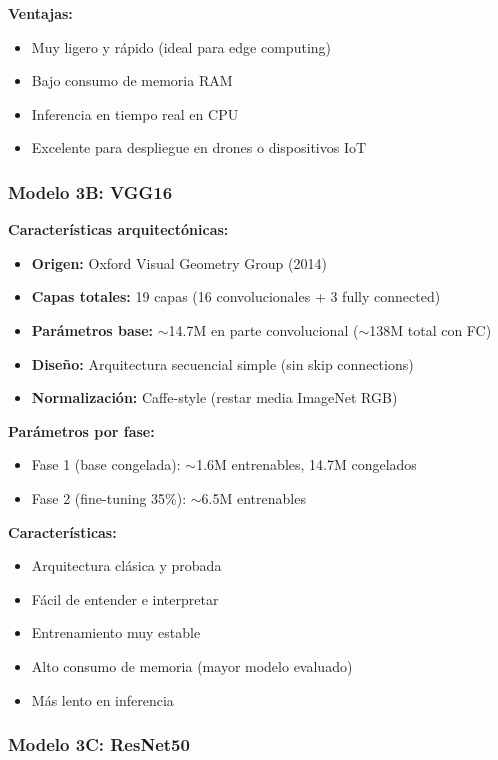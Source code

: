 \documentclass[11pt, a4paper]{article}
\begin{document}
\textbf{Ventajas:}
\begin{itemize}
    \item Muy ligero y rápido (ideal para edge computing)
    \item Bajo consumo de memoria RAM
    \item Inferencia en tiempo real en CPU
    \item Excelente para despliegue en drones o dispositivos IoT
\end{itemize}

\subsubsection{Modelo 3B: VGG16}

\textbf{Características arquitectónicas:}
\begin{itemize}
    \item \textbf{Origen:} Oxford Visual Geometry Group (2014)
    \item \textbf{Capas totales:} 19 capas (16 convolucionales + 3 fully connected)
    \item \textbf{Parámetros base:} $\sim$14.7M en parte convolucional ($\sim$138M total con FC)
    \item \textbf{Diseño:} Arquitectura secuencial simple (sin skip connections)
    \item \textbf{Normalización:} Caffe-style (restar media ImageNet RGB)
\end{itemize}

\textbf{Parámetros por fase:}
\begin{itemize}
    \item Fase 1 (base congelada): $\sim$1.6M entrenables, 14.7M congelados
    \item Fase 2 (fine-tuning 35\%): $\sim$6.5M entrenables
\end{itemize}

\textbf{Características:}
\begin{itemize}
    \item Arquitectura clásica y probada
    \item Fácil de entender e interpretar
    \item Entrenamiento muy estable
    \item Alto consumo de memoria (mayor modelo evaluado)
    \item Más lento en inferencia
\end{itemize}

\subsubsection{Modelo 3C: ResNet50}
\end{document}

